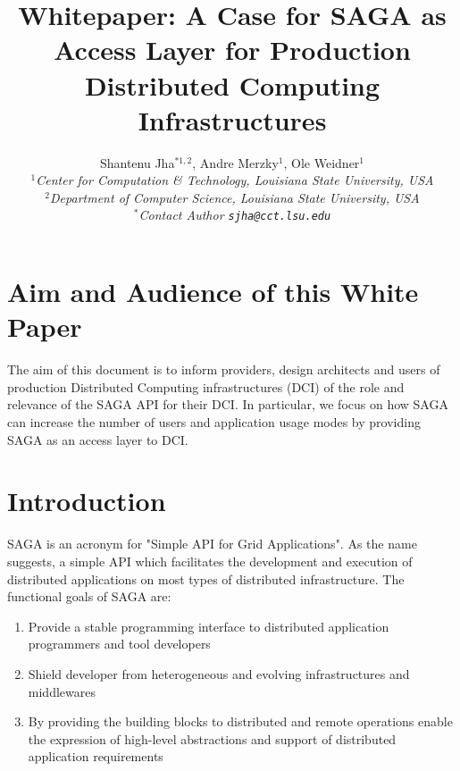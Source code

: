 \documentclass[12pt]{article}
\begin{document}
\title{Whitepaper: A Case for SAGA as Access Layer for Production
  Distributed Computing Infrastructures}

\author{Shantenu Jha$^{*1,2}$, Andre Merzky$^{1}$, Ole Weidner$^{1}$\\
  \small{\emph{$^{1}$Center for Computation \& Technology, Louisiana State University, USA}}\\
  \small{\emph{$^{2}$Department of Computer Science, Louisiana State University, USA}}\\
  \small{\emph{$^{*}$Contact Author \texttt{sjha@cct.lsu.edu}}}
  }


\maketitle

\section*{Aim and Audience of this White Paper}
The aim of this document is to inform providers, design architects and
users of production Distributed Computing infrastructures (DCI) of the
role and relevance of the SAGA API for their DCI. In particular, we
focus on how SAGA can increase the number of users and application
usage modes by providing SAGA as an access layer to DCI.




\section{Introduction}

SAGA is an acronym for "Simple API for Grid Applications". As the name
suggests, a simple API which facilitates the development and execution
of distributed applications on most types of distributed
infrastructure.  The functional goals of SAGA are:

 \begin{enumerate}

 \item Provide a stable programming interface to distributed
   application programmers and tool developers
 
 \item Shield developer from heterogeneous and evolving
   infrastructures and middlewares

 \item By providing the building blocks to distributed and remote
   operations enable the expression of high-level abstractions
   and support of distributed application requirements

 \end{enumerate}
\end{document}
